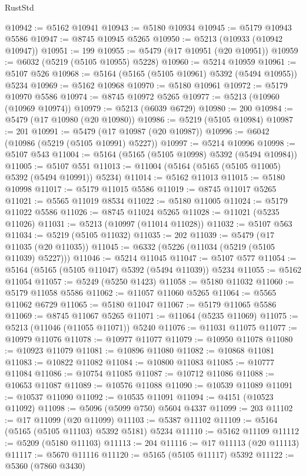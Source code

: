 \begin{lexlean}{RustStd}
\begin{coremodule}
@10942 := @5162 @10941
@10943 := @5180 @10934
@10945 := @5179 @10943 @5586
@10947 := @8745 @10945 @5265
@10950 := @5213 (@10933 (@10942 @10947))
@10951 := 199
@10955 := @5479 (@17 @10951 (@20 @10951))
@10959 := @6032 (@5219 (@5105 @10955) @5228)
@10960 := @5214 @10959
@10961 := @5107 @526
@10968 := @5164 (@5165 (@5105 @10961) @5392 (@5494 @10955)) @5234
@10969 := @5162 @10968
@10970 := @5180 @10961
@10972 := @5179 @10970 @5586
@10974 := @8745 @10972 @5265
@10977 := @5213 (@10960 (@10969 @10974))
@10979 := @5213 (@6039 @6729)
@10980 := 200
@10984 := @5479 (@17 @10980 (@20 @10980))
@10986 := @5219 (@5105 @10984)
@10987 := 201
@10991 := @5479 (@17 @10987 (@20 @10987))
@10996 := @6042 (@10986 (@5219 (@5105 @10991) @5227))
@10997 := @5214 @10996
@10998 := @5107 @543
@11004 := @5164 (@5165 (@5105 @10998) @5392 (@5494 @10984))
@11005 := @5107 @551
@11013 := @11004 (@5164 (@5165 (@5105 @11005) @5392 (@5494 @10991)) @5234)
@11014 := @5162 @11013
@11015 := @5180 @10998
@11017 := @5179 @11015 @5586
@11019 := @8745 @11017 @5265
@11021 := @5565 @11019 @8534
@11022 := @5180 @11005
@11024 := @5179 @11022 @5586
@11026 := @8745 @11024 @5265
@11028 := @11021 (@5235 @11026)
@11031 := @5213 (@10997 (@11014 @11028))
@11032 := @5107 @563
@11034 := @5219 (@5105 @11032)
@11035 := 202
@11039 := @5479 (@17 @11035 (@20 @11035))
@11045 := @6332 (@5226 (@11034 (@5219 (@5105 @11039) @5227)))
@11046 := @5214 @11045
@11047 := @5107 @577
@11054 := @5164 (@5165 (@5105 @11047) @5392 (@5494 @11039)) @5234
@11055 := @5162 @11054
@11057 := @5249 (@5250 @1423)
@11058 := @5180 @11032
@11060 := @5179 @11058 @5586
@11062 := @11057 @11060 @5265
@11064 := @5565 @11062 @6729
@11065 := @5180 @11047
@11067 := @5179 @11065 @5586
@11069 := @8745 @11067 @5265
@11071 := @11064 (@5235 @11069)
@11075 := @5213 (@11046 (@11055 @11071)) @5240
@11076 := @11031 @11075
@11077 := @10979 @11076
@11078 := @10977 @11077
@11079 := @10950 @11078
@11080 := @10923 @11079
@11081 := @10896 @11080
@11082 := @10868 @11081
@11083 := @10822 @11082
@11084 := @10800 @11083
@11085 := @10777 @11084
@11086 := @10754 @11085
@11087 := @10712 @11086
@11088 := @10653 @11087
@11089 := @10576 @11088
@11090 := @10539 @11089
@11091 := @10537 @11090
@11092 := @10535 @11091
@11094 := @4151 (@10523 @11092)
@11098 := @5096 (@5099 @750) @5604 @4337
@11099 := 203
@11102 := @17 @11099 (@20 @11099)
@11103 := @5387 @11102
@11109 := @5164 (@5165 (@5105 @11103) @5392 @5181) @5234
@11110 := @5162 @11109
@11112 := @5209 (@5180 @11103)
@11113 := 204
@11116 := @17 @11113 (@20 @11113)
@11117 := @5670 @11116
@11120 := @5165 (@5105 @11117) @5392
@11122 := @5360 (@7860 @3430)

\end{coremodule}
\end{lexlean}
